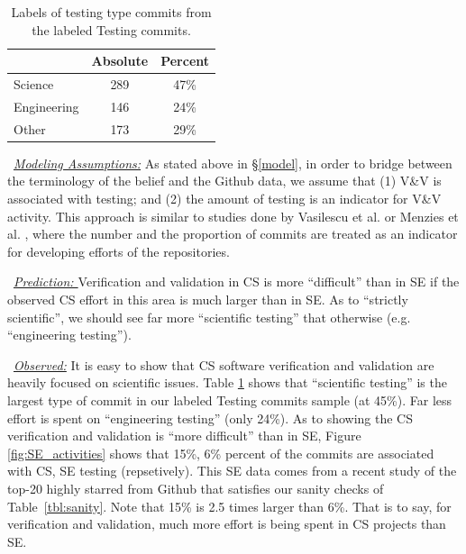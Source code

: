 \documentclass[sigconf]{acmart}
\newcommand{\bi}{\begin{itemize}}
\begin{document}
\begin{table}
\caption{Labels of testing type commits from the labeled Testing commits.}\label{tbl:testing}
\footnotesize \begin{tabular}{l|c|c}
\multicolumn{1}{c|}{} & \multicolumn{1}{c|}{Absolute} & \multicolumn{1}{c}{Percent}\\
\hline
Science & 289 & 47\% \\
Engineering & 146 & 24\% \\
Other & 173 & 29\% 
\end{tabular}
\end{table}\noindent~\textit{\underline{Modeling Assumptions:}} 
As stated above in \S\ref{model},
in order to bridge between the terminology of the belief and the Github data, we assume that (1) V\&V is associated with testing; and (2) the amount of testing is an indicator for V\&V activity. This approach is similar to studies done by Vasilescu et al. \cite{vasilescu16_limit} or Menzies et al. \cite{xia2019sequential}, where the number and the proportion of commits are treated as an indicator for developing efforts of the repositories. 

\noindent ~\textit{\underline{Prediction: }}
Verification and validation in CS is more
``difficult'' than in SE if the observed CS effort in this area
is much larger than in SE. As to ``strictly scientific'', we should see far more ``scientific
testing'' that otherwise (e.g. ``engineering testing''). 


\noindent ~\textit{\underline{Observed:}}
It is easy to show that CS software verification and validation are heavily focused on scientific issues.
Table \ref{tbl:testing} shows that ``scientific testing'' is the largest type of commit in our labeled Testing commits sample (at 45\%). 
Far less effort is spent on ``engineering testing'' (only 24\%). 
As to showing the CS verification and validation is ``more difficult'' than in SE,
  Figure \ref{fig:SE_activities} shows that
  15\%, 6\% percent of the commits
  are associated with CS, SE testing (repsetively).   This SE data comes from a recent study \cite{tu2019better} of the top-20 highly starred from Github that satisfies our sanity checks of Table~\ref{tbl:sanity}.
Note that  15\% is 2.5 times larger than 6\%. That is
to say, for  verification and validation, 
much more effort is being spent in CS projects than SE.

\end{document}
